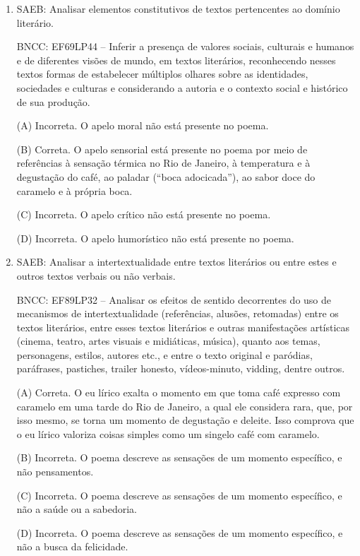 \begin{enumerate} 
\item
SAEB: Analisar elementos constitutivos de textos pertencentes ao domínio
literário. 

BNCC: EF69LP44 -- Inferir a presença de valores sociais,
culturais e humanos e de diferentes visões de mundo, em textos
literários, reconhecendo nesses textos formas de estabelecer múltiplos
olhares sobre as identidades, sociedades e culturas e considerando a
autoria e o contexto social e histórico de sua produção.

(A) Incorreta. O apelo moral não está presente no poema.

(B) Correta. O apelo sensorial está presente no poema por meio de
referências à sensação térmica no Rio de Janeiro, à temperatura e à
degustação do café, ao paladar (``boca adocicada''), ao sabor doce do
caramelo e à própria boca.

(C) Incorreta. O apelo crítico não está presente no poema.

(D) Incorreta. O apelo humorístico não está presente no poema.

\item

SAEB: Analisar a intertextualidade entre textos literários ou entre
estes e outros textos verbais ou não verbais. 

BNCC: EF89LP32 -- Analisar
os efeitos de sentido decorrentes do uso de mecanismos de
intertextualidade (referências, alusões, retomadas) entre os textos
literários, entre esses textos literários e outras manifestações
artísticas (cinema, teatro, artes visuais e midiáticas, música), quanto
aos temas, personagens, estilos, autores etc., e entre o texto original
e paródias, paráfrases, pastiches, trailer honesto, vídeos-minuto,
vidding, dentre outros.

(A) Correta. O eu lírico exalta o momento em que toma café expresso com
caramelo em uma tarde do Rio de Janeiro, a qual ele considera rara, que,
por isso mesmo, se torna um momento de degustação e deleite. Isso
comprova que o eu lírico valoriza coisas simples como um singelo café
com caramelo.

(B) Incorreta. O poema descreve as sensações de um momento específico, e
não pensamentos.

(C) Incorreta. O poema descreve as sensações de um momento específico, e
não a saúde ou a sabedoria.

(D) Incorreta. O poema descreve as sensações de um momento específico, e
não a busca da felicidade.


\end{enumerate}
